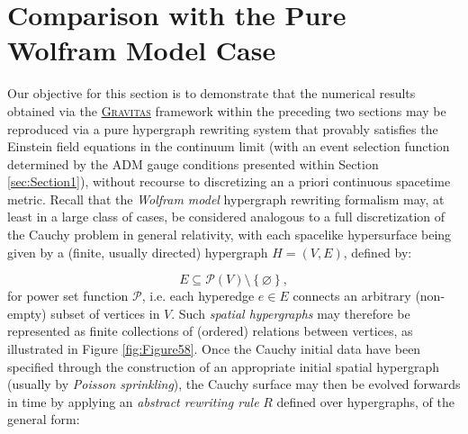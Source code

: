 \documentclass{article}
\begin{document}
\clearpage

\section{Comparison with the Pure Wolfram Model Case}
\label{sec:Section4}

Our objective for this section is to demonstrate that the numerical results obtained via the \href{https://github.com/JonathanGorard/Gravitas}{\textsc{Gravitas}} framework within the preceding two sections may be reproduced via a pure hypergraph rewriting system that provably satisfies the Einstein field equations in the continuum limit (with an event selection function determined by the ADM gauge conditions presented within Section \ref{sec:Section1}), without recourse to discretizing an a priori continuous spacetime metric. Recall that the \textit{Wolfram model} hypergraph rewriting formalism\cite{wolfram}\cite{wolfram2}\cite{gorard}\cite{gorard2} may, at least in a large class of cases, be considered analogous to a full discretization of the Cauchy problem in general relativity\cite{gorard4}, with each spacelike hypersurface being given by a (finite, usually directed) hypergraph ${H = \left( V, E \right)}$, defined by:

\begin{equation}
E \subseteq \mathcal{P} \left( V \right) \setminus \left\lbrace \varnothing \right\rbrace,
\end{equation}
for power set function ${\mathcal{P}}$, i.e. each hyperedge ${e \in E}$ connects an arbitrary (non-empty) subset of vertices in $V$. Such \textit{spatial hypergraphs} may therefore be represented as finite collections of (ordered) relations between vertices, as illustrated in Figure \ref{fig:Figure58}. Once the Cauchy initial data have been specified through the construction of an  appropriate initial spatial hypergraph (usually by \textit{Poisson sprinkling}\cite{gorard3}), the Cauchy surface may then be evolved forwards in time by applying an \textit{abstract rewriting rule} $R$ defined over hypergraphs, of the general form:
\end{document}
